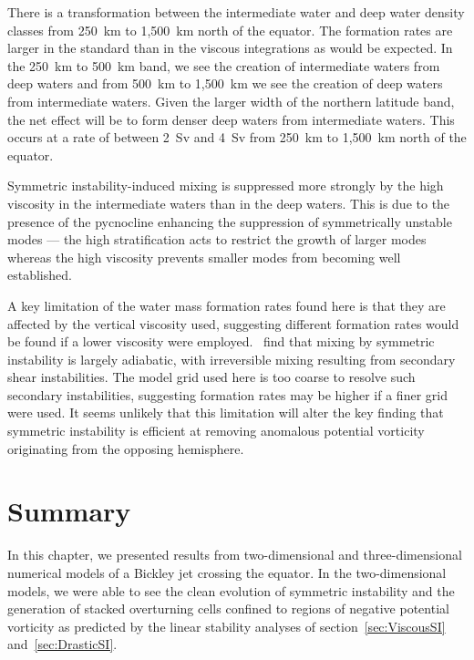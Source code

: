 There is a transformation between the intermediate water and deep water density classes from 250~km to 1,500~km north of the equator. The formation rates are larger in the standard than in the viscous integrations as would be expected. In the 250~km to 500~km band, we see the creation of intermediate waters from deep waters and from 500~km to 1,500~km we see the creation of deep waters from intermediate waters. Given the larger width of the northern latitude band, the net effect will be to form denser deep waters from intermediate waters. This occurs at a rate of between 2~Sv and 4~Sv from 250~km to 1,500~km north of the equator.

Symmetric instability-induced mixing is suppressed more strongly by the high viscosity in the intermediate waters than in the deep waters. This is due to the presence of the pycnocline enhancing the suppression of symmetrically unstable modes --- the high stratification acts to restrict the growth of larger modes whereas the high viscosity prevents smaller modes from becoming well established.

A key limitation of the water mass formation rates found here is that they are affected by the vertical viscosity used, suggesting different formation rates would be found if a lower viscosity were employed.~\citet{Yankovsky2019} find that mixing by symmetric instability is largely adiabatic, with irreversible mixing resulting from secondary shear instabilities. The model grid used here is too coarse to resolve such secondary instabilities, suggesting formation rates may be higher if a finer grid were used. It seems unlikely that this limitation will alter the key finding that symmetric instability is efficient at removing anomalous potential vorticity originating from the opposing hemisphere.


\section{Summary}
\label{sec:Summary3}
In this chapter, we presented results from two-dimensional and three-dimensional numerical models of a Bickley jet crossing the equator. In the two-dimensional models, we were able to see the clean evolution of symmetric instability and the generation of stacked overturning cells confined to regions of negative potential vorticity as predicted by the linear stability analyses of section~\ref{sec:ViscousSI} and~\ref{sec:DrasticSI}.

